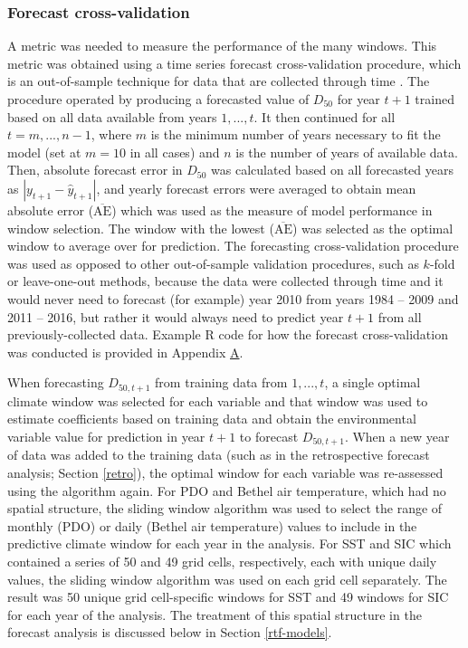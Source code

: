 \documentclass[12pt,]{book}
\theoremstyle{definition}
\theoremstyle{definition}
\theoremstyle{definition}
\theoremstyle{remark}
\begin{document}
\subsubsection{Forecast cross-validation}\label{fcst-cv}

A metric was needed to measure the performance of the many windows. This
metric was obtained using a time series forecast cross-validation
procedure, which is an out-of-sample technique for data that are
collected through time \citep{arlot-celisse-2010}. The procedure
operated by producing a forecasted value of \(D_{50}\) for year \(t+1\)
trained based on all data available from years \(1, ..., t\). It then
continued for all \(t = m, ..., n-1\), where \(m\) is the minimum number
of years necessary to fit the model (set at \(m = 10\) in all cases) and
\(n\) is the number of years of available data. Then, absolute forecast
error in \(D_{50}\) was calculated based on all forecasted years as
\(|y_{t+1} - \hat{y}_{t+1}|\), and yearly forecast errors were averaged
to obtain mean absolute error (\(\overline{\text{AE}}\)) which was used
as the measure of model performance in window selection. The window with
the lowest (\(\overline{\text{AE}}\)) was selected as the optimal window
to average over for prediction. The forecasting cross-validation
procedure was used as opposed to other out-of-sample validation
procedures, such as \(k\)-fold or leave-one-out methods, because the
data were collected through time and it would never need to forecast
(for example) year 2010 from years 1984 -- 2009 and 2011 -- 2016, but
rather it would always need to predict year \(t+1\) from all
previously-collected data. Example R code for how the forecast
cross-validation was conducted is provided in Appendix
\protect\hyperlink{appendix-a}{A}.

When forecasting \(D_{50,t+1}\) from training data from \(1,...,t\), a
single optimal climate window was selected for each variable and that
window was used to estimate coefficients based on training data and
obtain the environmental variable value for prediction in year \(t+1\)
to forecast \(D_{50,t+1}\). When a new year of data was added to the
training data (such as in the retrospective forecast analysis; Section
\ref{retro}), the optimal window for each variable was re-assessed using
the algorithm again. For PDO and Bethel air temperature, which had no
spatial structure, the sliding window algorithm was used to select the
range of monthly (PDO) or daily (Bethel air temperature) values to
include in the predictive climate window for each year in the analysis.
For SST and SIC which contained a series of 50 and 49 grid cells,
respectively, each with unique daily values, the sliding window
algorithm was used on each grid cell separately. The result was 50
unique grid cell-specific windows for SST and 49 windows for SIC for
each year of the analysis. The treatment of this spatial structure in
the forecast analysis is discussed below in Section \ref{rtf-models}.
\end{document}
